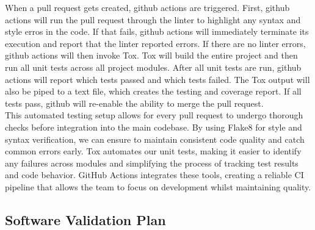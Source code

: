 \documentclass[12pt, titlepage]{article}
\begin{document}
\noindent
When a pull request gets created, github actions are triggered. First, github actions will run the
pull request through the linter to highlight any syntax and style erros in the code. If that fails,
github actions will immediately terminate its execution and report that the linter reported errors.
If there are no linter errors, github actions will then invoke Tox. Tox will build the entire project
and then run all unit tests across all project modules. After all unit tests are run, github actions
will report which tests passed and which tests failed. The Tox output will also be piped to a text
file, which creates the testing and coverage report. If all tests pass, github will re-enable the
ability to merge the pull request.\\

\noindent
This automated testing setup allows for every pull request to undergo thorough checks before integration
into the main codebase. By using Flake8 for style and syntax verification, we can ensure to maintain consistent
code quality and catch common errors early. Tox automates our unit tests, making it easier to identify any failures
across modules and simplifying the process of tracking test results and code behavior. GitHub Actions integrates
these tools, creating a reliable CI pipeline that allows the team to focus on development whilst maintaining quality.

\subsection{Software Validation Plan}




\end{document}
